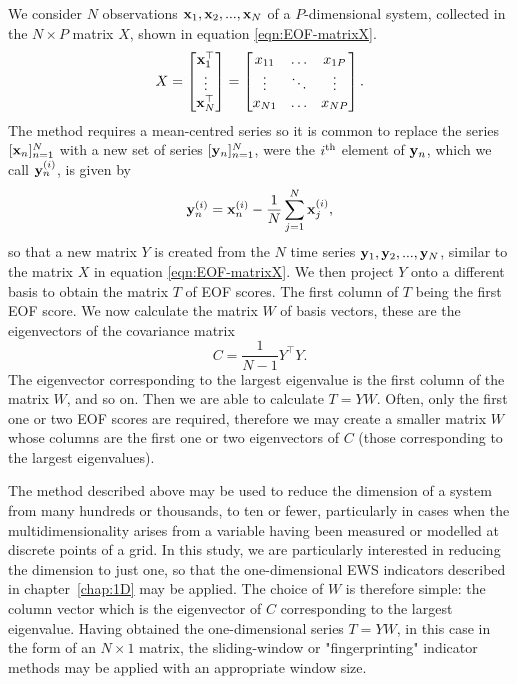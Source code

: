 We consider $N$ observations  $\mathbf{x}_1, \mathbf{x}_2, ..., \mathbf{x}_N$ of a $P$-dimensional system, collected in the $N\times P$ matrix $X$, shown in equation \ref{eqn:EOF-matrixX}.
	\begin{equation}
		X = \begin{bmatrix}
		\mathbf{x}_1^\top  \\
		\vdots \\
		\mathbf{x}_N^\top 
		\end{bmatrix}
		= \begin{bmatrix}
		x_{11} & \hdots & x_{1P} \\
		\vdots & \ddots & \vdots \\
		x_{N1} & \hdots & x_{NP} 
		\end{bmatrix}.
	\label{eqn:EOF-matrixX}
	\end{equation}
The method requires a mean-centred series so it is common to replace the series $[\mathbf{x}_n]_{n=1}^N$ with a new set of series $[\mathbf{y}_n]_{n=1}^N$, were the $i\textsuperscript{th}$ element of $\mathbf{y}_n$, which we call $\mathbf{y}_n^{(i)}$, is given by
	\begin{equation}
	\mathbf{y}_n^{(i)} = \mathbf{x}_n^{(i)} - \frac{1}{N}\sum_{j = 1}^N \mathbf{x}_j^{(i)},
	\end{equation}
so that a new matrix $Y$ is created from the $N$ time series $\mathbf{y}_1, \mathbf{y}_2, ..., \mathbf{y}_N$, similar to the matrix $X$ in equation \ref{eqn:EOF-matrixX}.
We then project $Y$ onto a different basis to obtain the matrix $T$ of EOF scores. The first column of $T$ being the first EOF score. We now calculate the matrix $W$ of basis vectors, these are the eigenvectors of the covariance matrix 
	 \begin{equation}
		 C = \frac{1}{N-1}Y^\top Y.
		 \label{eqn:2D:EOFmatrixC}
	 \end{equation}
The eigenvector corresponding to the largest eigenvalue is the first column of the matrix $W$, and so on. Then we are able to calculate $T = YW$. Often, only the first one or two EOF scores are required, therefore we may create a smaller matrix $W$ whose columns are the first one or two eigenvectors of $C$ (those corresponding to the largest eigenvalues).

The method described above may be used to reduce the dimension of a system from many hundreds or thousands, to ten or fewer, particularly in cases when the multidimensionality arises from a variable having been measured or modelled at discrete points of a grid. In this study, we are particularly interested in reducing the dimension to just one, so that the one-dimensional EWS indicators described in chapter~\ref{chap:1D} may be applied. The choice of $W$ is therefore simple: the column vector which is the eigenvector of $C$ corresponding to the largest eigenvalue. Having obtained the one-dimensional series $T=YW$, in this case in the form of an $N\times 1$ matrix, the sliding-window or "fingerprinting" indicator methods may be applied with an appropriate window size. 


